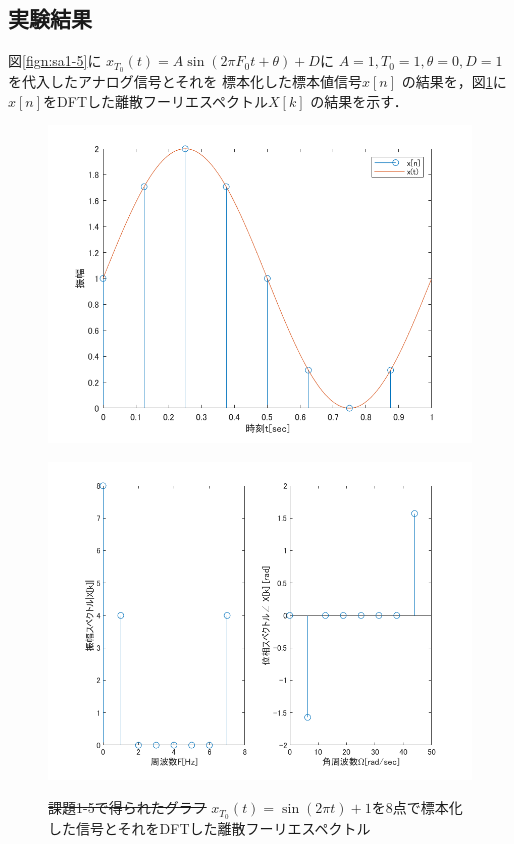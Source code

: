 \documentclass[11pt, a4paper, titlepage]{ltjsarticle}
\begin{document}
\subsection*{実験結果}
図\ref*{fign:sa1-5}に
$x_{T_{0}}(t)=A\sin(2\pi F_{0}t+\theta)+ D$に
$A=1,T_{0}=1,\theta=0,D=1$を代入したアナログ信号とそれを
標本化した標本値信号$x[n]$
の結果を，図\ref*{fign:sp1-5}に
$x[n]$をDFTした離散フーリエスペクトル$X[k]$
の結果を示す．
\begin{figure}[h]
\begin{center}
\begin{minipage}[t]{0.48\columnwidth}
    \includegraphics[width=\columnwidth]{figures/sampling1-5.png}
    \label{fign:sa1-5}
\end{minipage}
\begin{minipage}[t]{0.48\columnwidth}
    \includegraphics[width=\columnwidth]{figures/spectrum1-5.png}
    \label{fign:sp1-5}
\end{minipage}
\end{center}
\caption{\sout{課題1-5で得られたグラフ}
$x_{T_{0}}(t)=\sin(2\pi t)+1$を8点で標本化した信号とそれをDFTした離散フーリエスペクトル}
\end{figure}
\end{document}
